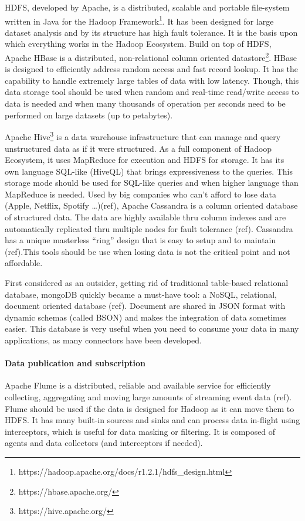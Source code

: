 HDFS, developed by Apache, is a distributed, scalable and portable file-system written in Java for the Hadoop Framework\footnote{https://hadoop.apache.org/docs/r1.2.1/hdfs\_design.html}.
It has been designed for large dataset analysis and by its structure has high fault tolerance. It is the basis upon which everything works in the Hadoop Ecosystem.
Build on top of HDFS, Apache HBase is a distributed, non-relational column oriented datastore\footnote{https://hbase.apache.org/}.
HBase is designed to efficiently address random access and fast record lookup.
It has the capability to handle extremely large tables of data with low latency.
Though, this data storage tool should be used when random and real-time read/write access to data is needed and when many thousands of operation per seconds need to be performed on large datasets (up to petabytes).

Apache Hive\footnote{https://hive.apache.org/} is a data warehouse infrastructure that can manage and query unstructured data as if it were structured.
As a full component of Hadoop Ecosystem, it uses MapReduce for execution and HDFS for storage.
It has its own language SQL-like (HiveQL) that brings expressiveness to the queries.
This storage mode should be used for SQL-like queries and when higher language than MapReduce is needed.
Used by big companies who can’t afford to lose data (Apple, Netflix, Spotify …)(ref), Apache Cassandra is a column oriented database of structured data. The data are highly available thru column indexes and are automatically replicated thru multiple nodes for fault tolerance (ref).
Cassandra has a unique masterless “ring” design that is easy to setup and to maintain (ref).This tools should be use when losing data is not the critical point and not affordable.  

First considered as an outsider, getting rid of traditional table-based relational database, mongoDB quickly became a must-have tool: a NoSQL, relational, document oriented database (ref).
Document are shared in JSON format with dynamic schemas (called BSON) and makes the integration of data sometimes easier.
This database is very useful when you need to consume your data in many applications, as many connectors have been developed.

\paragraph{Data publication and subscription}

Apache Flume is a distributed, reliable and available service for efficiently collecting, aggregating and moving large amounts of streaming event data (ref).
Flume should be used if the data is designed for Hadoop as it can move them to HDFS.
It has many built-in sources and sinks and can process data in-flight using interceptors, which is useful for data masking or filtering.
It is composed of agents and data collectors (and interceptors if needed).


